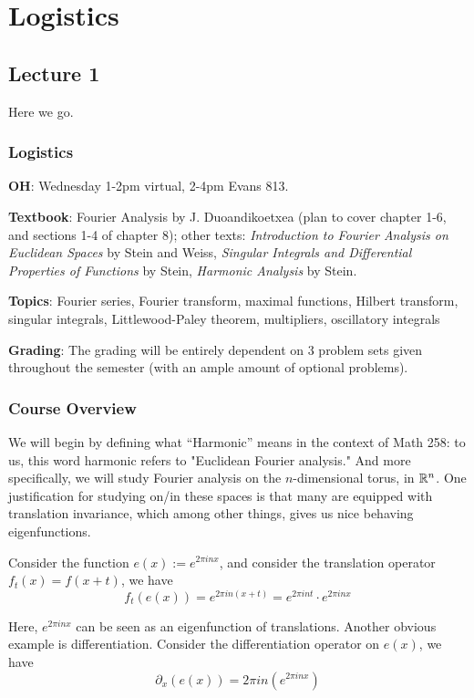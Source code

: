 \chapter*{Logistics}
\section{Lecture 1}
Here we go.
\subsection{Logistics}
\textbf{OH}: Wednesday 1-2pm virtual, 2-4pm Evans 813.

\textbf{Textbook}: Fourier Analysis by J. Duoandikoetxea (plan to cover chapter 1-6, and sections 1-4 of chapter 8); other texts: \textit{Introduction to Fourier Analysis on Euclidean Spaces} by Stein and Weiss, \textit{Singular Integrals and Differential Properties of Functions} by Stein, \textit{Harmonic Analysis} by Stein.

\textbf{Topics}: Fourier series, Fourier transform, maximal functions, Hilbert transform, singular integrals, Littlewood-Paley theorem, multipliers, oscillatory integrals

\textbf{Grading}: The grading will be entirely dependent on 3 problem sets given throughout the semester (with an ample amount of optional problems).


\subsection{Course Overview}
We will begin by defining what ``Harmonic'' means in the context of Math 258: to us, this word harmonic refers to "Euclidean Fourier analysis." And more specifically, we will study Fourier analysis on the $n$-dimensional torus, in $\mathbb{R}^n$. One justification for studying on/in these spaces is that many are equipped with translation invariance, which among other things, gives us nice behaving eigenfunctions.

Consider the function $e(x):=e^{2\pi inx}$, and consider the translation operator $f_t(x)=f(x+t)$, we have
\begin{equation*}
    f_t(e(x))=e^{2\pi in(x+t)}=e^{2\pi int}\cdot e^{2\pi inx}
\end{equation*}

Here, $e^{2\pi inx}$ can be seen as an eigenfunction of translations. Another obvious example is differentiation. Consider the differentiation operator on $e(x)$, we have
\begin{equation*}
    \partial_x(e(x))=2\pi in(e^{2\pi inx})
\end{equation*}

